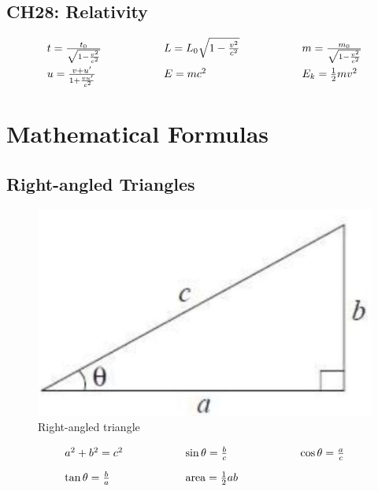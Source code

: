 \documentclass[12pt,a4paper]{article}
\begin{document}
\subsection{CH28: Relativity}
\begin{align*}
  \begin{array}{l@{\hspace{2cm}}l@{\hspace{2cm}}l}
    t = \frac{t_0}{\sqrt{1-\frac{v^2}{c^2}}} & L = L_0\sqrt{1-\frac{v^2}{c^2}} & m = \frac{m_0}{\sqrt{1-\frac{v^2}{c^2}}} \\[1em]
    u = \frac{v+u'}{1+\frac{vu'}{c^2}} & E = mc^2 & E_k = \frac{1}{2}mv^2
  \end{array}
\end{align*}


\fi


\newpage
\section{Mathematical Formulas}

\subsection{Right-angled Triangles}

\begin{figure}[H]
    \centering
    \includegraphics[width=0.4\linewidth]{phys12-formulas-relativity-thermodynamics.png}
    \caption{Right-angled triangle}
    \label{fig:Right-angled triangle}
\end{figure}

\begin{align*}
  \begin{array}{l@{\hspace{2cm}}l@{\hspace{2cm}}l}
    a^2 + b^2 = c^2 & \sin \theta = \frac{b}{c} & \cos \theta = \frac{a}{c} \\[1em]
    \tan \theta = \frac{b}{a} & \text{area} = \frac{1}{2}ab &
  \end{array}
\end{align*}
\end{document}
